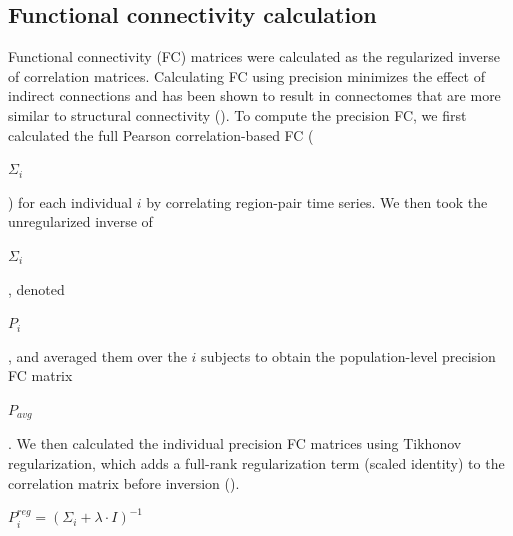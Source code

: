\documentclass[phd,tocprelim]{cornell}
\begin{document}
	\subsection{Functional connectivity calculation}
	 Functional connectivity (FC) matrices were calculated as the regularized inverse of correlation matrices. Calculating FC using precision minimizes the effect of indirect connections and has been shown to result in connectomes that are more similar to structural connectivity (\cite{Wodeyar2020-kz, Liegeois2020-ua}). To compute the precision FC, we first calculated the full Pearson correlation-based FC ( \begin{Large}$\Sigma_i$ \end{Large}) for each individual $i$ by correlating region-pair time series. We then took the unregularized inverse of \begin{Large}$\Sigma_i$\end{Large}, denoted \begin{Large}$P_i$\end{Large}, and averaged them over the $i$ subjects to obtain the population-level precision FC matrix  \begin{Large}$P_{avg}$\end{Large}. We then calculated the individual precision FC matrices using Tikhonov regularization, which adds a full-rank regularization term (scaled identity) to the correlation matrix before inversion (\cite{Liegeois2020-ua}).
	 
\begin{Large}
\begin{center}

       $ P_i^{reg} = (\Sigma_i + \lambda \cdot I)^{-1}$

\end{center}
\end{Large}
\end{document}
